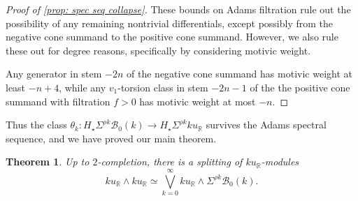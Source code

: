 \documentclass{amsart}
\newtheorem{theorem}[equation]{Theorem}
\theoremstyle{plain}
\numberwithin{equation}{section}
\numberwithin{figure}{section}
\DeclareMathOperator{\Ext}{Ext}
\newcommand{\mR}{{\mathbb R}}
\newcommand{\cB}{{\mathcal B}}
\newcommand{\cE}{{\mathcal E}}
\newcommand{\0}{\langle 0 \rangle }
\begin{document}
\begin{proof}[Proof of \cref{prop: spec seq collapse}]
These bounds on Adams filtration rule out the possibility of any remaining nontrivial differentials, except possibly from the negative cone summand to the positive cone summand. However, we also rule these out for degree reasons, specifically by considering motivic weight.

Any generator in stem $-2n$ of the negative cone summand has motivic weight at least $-n + 4$, while any $v_{1}$-torsion class in stem $-2n-1$ of the the positive cone summand with filtration $f > 0$ has  motivic weight at most $-n$. 

\end{proof}
Thus the class $\theta_{k}:H_{\star}\Sigma^{\rho k}\cB_{0}(k)\rightarrow H_{\star}\Sigma^{\rho k}ku_{\mR}$ survives the Adams spectral sequence, and we have proved our main theorem.

\begin{theorem} \label{thm:mainTheorem}
    Up to $2$-completion, there is a splitting of $ku_{\mR}$-modules
    \[ku_{\mR} \wedge ku_{\mR}  \simeq \overset{\infty}{\underset{k=0}{\bigvee}} ku_{\mR} \wedge \Sigma^{\rho k}\cB_{0}(k).\]
\end{theorem}
\end{document}
